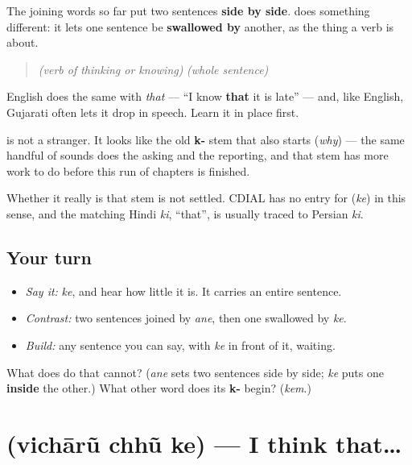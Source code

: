 \begin{cousinweb}
The joining words so far put two sentences \textbf{side by side}. \textbf{} does something different: it lets one sentence be \textbf{swallowed by} another, as the thing a verb is about.

\begin{quote}
\emph{(verb of thinking or knowing)} \textbf{} \emph{(whole sentence)}
\end{quote}

English does the same with \emph{that} — \textquotedblleft{}I know \textbf{that} it is late\textquotedblright{} — and, like English, Gujarati often lets it drop in speech. Learn it in place first.

\textbf{} is not a stranger. It looks like the old \textbf{k-} stem that also starts \textbf{} (\emph{why}) — the same handful of sounds does the asking and the reporting, and that stem has more work to do before this run of chapters is finished.

Whether it really is that stem is not settled. CDIAL has no entry for \textbf{} (\emph{ke}) in this sense, and the matching Hindi \emph{ki}, \textquotedblleft{}that\textquotedblright{}, is usually traced to Persian \emph{ki}.
\end{cousinweb}

\subsection*{Your turn}
\begin{itemize}
\raggedright
  \item \emph{Say it:} \emph{ke}, and hear how little it is. It carries an entire sentence.
  \item \emph{Contrast:} two sentences joined by \emph{ane}, then one swallowed by \emph{ke}.
  \item \emph{Build:} any sentence you can say, with \emph{ke} in front of it, waiting.
\end{itemize}

\begin{tcolorbox}[breakable,colback=teal!4,colframe=teal!35!black,title={Before you move on}]
What does \textbf{} do that \textbf{} cannot? (\emph{ane} sets two sentences side by side; \emph{ke} puts one \textbf{inside} the other.) What other word does its \textbf{k-} begin? (\emph{kem}.)
\end{tcolorbox}
\section[\texorpdfstring{\gu{વિચારું} \gu{છું} \gu{કે} (vichārũ chhũ ke)}{વિચારું છું કે (vichārũ chhũ ke)}]{   (vichārũ chhũ ke) — I think that…}

